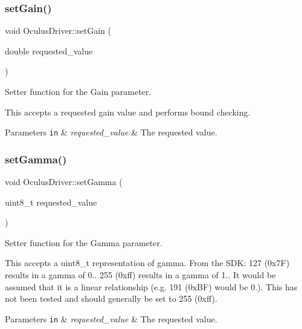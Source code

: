 \subsubsection{\texorpdfstring{set\+Gain()}{setGain()}}
{\footnotesize\ttfamily void Oculus\+Driver\+::set\+Gain (\begin{DoxyParamCaption}\item[{double}]{requested\+\_\+value }\end{DoxyParamCaption})}

Setter function for the Gain parameter.

This accepts a requested gain value and performs bound checking.


\begin{DoxyParams}[1]{Parameters}
\mbox{\tt in}  & {\em requested\+\_\+value} & The requested value. \\
\hline
\end{DoxyParams}
\mbox{\label{classOculusDriver_a3ce9cbc386f6617e80ef10036f3c6802}} 
\subsubsection{\texorpdfstring{set\+Gamma()}{setGamma()}}
{\footnotesize\ttfamily void Oculus\+Driver\+::set\+Gamma (\begin{DoxyParamCaption}\item[{uint8\+\_\+t}]{requested\+\_\+value }\end{DoxyParamCaption})}

Setter function for the Gamma parameter.

This accepts a uint8\+\_\+t representation of gamma. From the S\+DK\+: 127 (0x7F) results in a gamma of 0.. 255 (0xff) results in a gamma of 1.. It would be assumed that it is a linear relationship (e.\+g. 191 (0x\+BF) would be 0.). This has not been tested and should generally be set to 255 (0xff).


\begin{DoxyParams}[1]{Parameters}
\mbox{\tt in}  & {\em requested\+\_\+value} & The requested value. \\
\hline
\end{DoxyParams}
\mbox{\label{classOculusDriver_a31d7bd517c4774d307192bfbaeeced2d}} 
